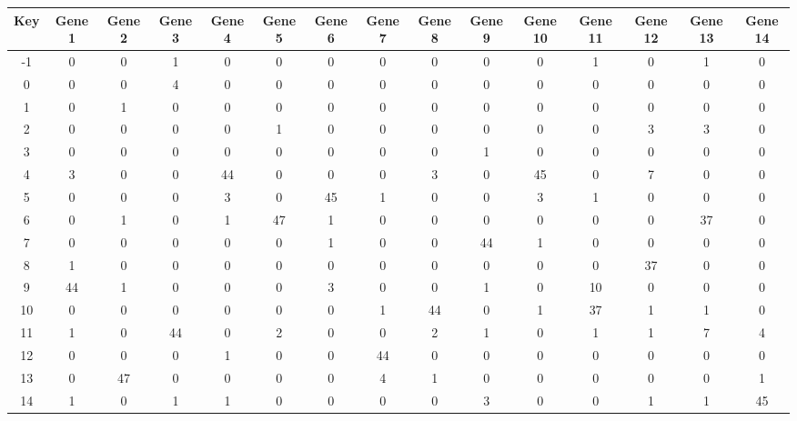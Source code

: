 \begin{tabular}{|c|c|c|c|c|c|c|c|c|c|c|c|c|c|c|}
\hline
Key & Gene 1 & Gene 2 & Gene 3 & Gene 4 & Gene 5 & Gene 6 & Gene 7 & Gene 8 & Gene 9 & Gene 10 & Gene 11 & Gene 12 & Gene 13 & Gene 14 \\
\hline
-1 & 0 & 0 & 1 & 0 & 0 & 0 & 0 & 0 & 0 & 0 & 1 & 0 & 1 & 0 \\
0 & 0 & 0 & 4 & 0 & 0 & 0 & 0 & 0 & 0 & 0 & 0 & 0 & 0 & 0 \\
1 & 0 & 1 & 0 & 0 & 0 & 0 & 0 & 0 & 0 & 0 & 0 & 0 & 0 & 0 \\
2 & 0 & 0 & 0 & 0 & 1 & 0 & 0 & 0 & 0 & 0 & 0 & 3 & 3 & 0 \\
3 & 0 & 0 & 0 & 0 & 0 & 0 & 0 & 0 & 1 & 0 & 0 & 0 & 0 & 0 \\
4 & 3 & 0 & 0 & 44 & 0 & 0 & 0 & 3 & 0 & 45 & 0 & 7 & 0 & 0 \\
5 & 0 & 0 & 0 & 3 & 0 & 45 & 1 & 0 & 0 & 3 & 1 & 0 & 0 & 0 \\
6 & 0 & 1 & 0 & 1 & 47 & 1 & 0 & 0 & 0 & 0 & 0 & 0 & 37 & 0 \\
7 & 0 & 0 & 0 & 0 & 0 & 1 & 0 & 0 & 44 & 1 & 0 & 0 & 0 & 0 \\
8 & 1 & 0 & 0 & 0 & 0 & 0 & 0 & 0 & 0 & 0 & 0 & 37 & 0 & 0 \\
9 & 44 & 1 & 0 & 0 & 0 & 3 & 0 & 0 & 1 & 0 & 10 & 0 & 0 & 0 \\
10 & 0 & 0 & 0 & 0 & 0 & 0 & 1 & 44 & 0 & 1 & 37 & 1 & 1 & 0 \\
11 & 1 & 0 & 44 & 0 & 2 & 0 & 0 & 2 & 1 & 0 & 1 & 1 & 7 & 4 \\
12 & 0 & 0 & 0 & 1 & 0 & 0 & 44 & 0 & 0 & 0 & 0 & 0 & 0 & 0 \\
13 & 0 & 47 & 0 & 0 & 0 & 0 & 4 & 1 & 0 & 0 & 0 & 0 & 0 & 1 \\
14 & 1 & 0 & 1 & 1 & 0 & 0 & 0 & 0 & 3 & 0 & 0 & 1 & 1 & 45 \\
\hline
\end{tabular}